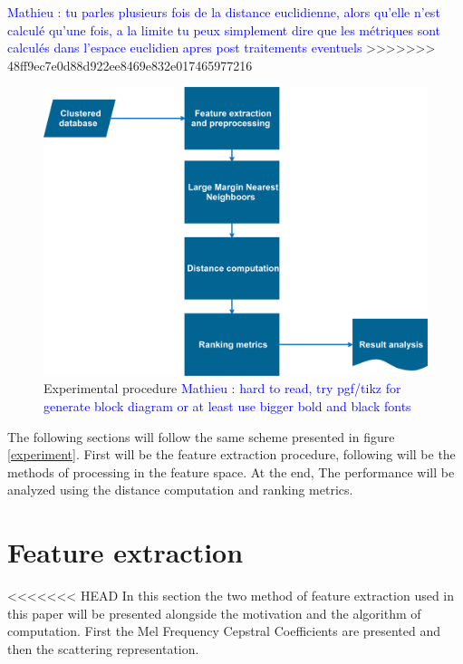 \documentclass[hidelinks,12pt]{report}
\newcommand{\ml}[1]{\textcolor{blue}{ Mathieu : #1}}
\begin{document}
\ml{tu parles plusieurs fois de la distance euclidienne, alors qu'elle n'est calculé qu'une fois, a la limite tu peux simplement dire que les métriques sont calculés dans l'espace euclidien apres post traitements eventuels}
>>>>>>> 48ff9ec7e0d88d922ee8469e832e017465977216

\begin{figure}[t!]
  
  \centering
	    \includegraphics[width=1\textwidth]{experimental_procedure}
    \caption{Experimental procedure \ml{hard to read, try pgf/tikz for generate block diagram or at least use bigger bold and black fonts} }
    \label{expermient}
\end{figure}
The following sections will follow the same scheme presented in figure \ref{experiment}. First will be the feature extraction procedure, following will be the methods of processing in the feature space. At the end, The performance will be analyzed using the distance computation and ranking metrics.

\section{Feature extraction}
<<<<<<< HEAD
In this section the two method of feature extraction used in this paper will be presented alongside the motivation and the algorithm of computation. First the Mel Frequency Cepstral Coefficients are presented and then the scattering representation. 
\end{document}
